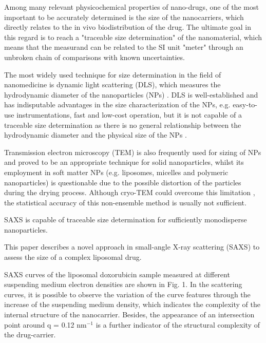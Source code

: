 Among many relevant physicochemical properties of nano-drugs, one of the most important to be accurately determined is the size of the nanocarriers, which directly relates to the in vivo biodistribution of the drug. The ultimate goal in this regard is to reach a "traceable size determination" of the nanomaterial, which means that the measurand can be related to the SI unit "meter" through an unbroken chain of comparisons with known uncertainties. 

The most widely used technique for size determination in the field of nanomedicine is dynamic light scattering (DLS), which measures the hydrodynamic diameter of the nanoparticles (NPs) \cite{murphy_static_1997, hallett_vesicle_1991, egelhaaf_determination_1996, takahashi_precise_2008, jans_dynamic_2009, hoo_comparison_2008}. DLS is well-established and has indisputable advantages in the size characterization of the NPs, e.g. easy-to-use instrumentations, fast and low-cost operation, but it is not capable of a traceable size determination as there is no general relationship between the hydrodynamic diameter and the physical size of the NPs \cite{meli_traceable_2012}. 

Transmission electron microscopy (TEM) is also frequently used for sizing of NPs and proved to be an appropriate technique for solid nanoparticles, whilst its employment in soft matter NPs (e.g. liposomes, micelles and polymeric nanoparticles) is questionable due to the possible distortion of the particles during the drying process.  Although cryo-TEM could overcome this limitation \cite{li_doxorubicin_1998}, the statistical accuracy of this non-ensemble method is usually not sufficient.
 
SAXS is capable of traceable size determination for sufficiently monodisperse nanoparticles.

This paper describes a novel approach in small-angle X-ray scattering (SAXS) to assess the size of a complex liposomal drug. 






SAXS curves of the liposomal doxorubicin sample measured at different suspending medium electron densities are shown in Fig. 1. In the scattering curves, it is possible to observe the variation of the curve features through the increase of the suspending medium density, which indicates the complexity of the internal structure of the nanocarrier. Besides, the appearance of an intersection point around q = 0.12 nm$^{-1}$ is a further indicator of the structural complexity of the drug-carrier.

